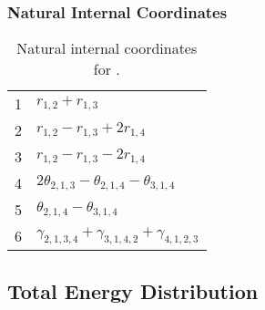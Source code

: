 \documentclass[10pt,oneside]{article}
\begin{document}
\begin{table}[h!]
\subsubsection*{Natural Internal Coordinates}
\centering
\caption{Natural internal coordinates for .}
\small
\begin{tabular}{ll}
\toprule
  1   & $r_{1,2} + r_{1,3}$ \\
  2   & $r_{1,2} - r_{1,3} + 2r_{1,4}$ \\
  3   & $r_{1,2} - r_{1,3} - 2r_{1,4}$ \\
  4   & $2\theta_{2,1,3} - \theta_{2,1,4} - \theta_{3,1,4}$ \\
  5   & $\theta_{2,1,4} - \theta_{3,1,4}$ \\
  6   & $\gamma_{2,1,3,4} + \gamma_{3,1,4,2} + \gamma_{4,1,2,3}$ \\
\bottomrule
\end{tabular}
\end{table}

\begin{table}
\subsection*{Total Energy Distribution}
\centering\end{table}

\clearpage

\subsection{}
\end{document}
